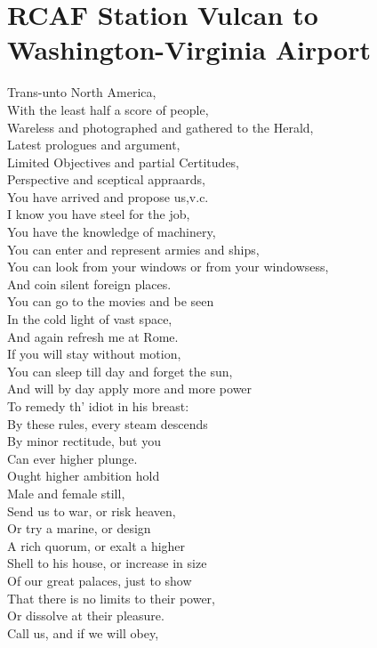 \documentclass[smalldemyvopaper,11pt,twoside,onecolumn,openright,extrafontsizes]{memoir}
\begin{document}
\chapter{RCAF Station Vulcan to Washington-Virginia Airport}
Trans-unto North America,
\\With the least half a score of people,
\\Wareless and photographed and gathered to the Herald,
\\Latest prologues and argument,
\\Limited Objectives and partial Certitudes,
\\Perspective and sceptical appraards,
\\You have arrived and propose us,v.c.
\\I know you have steel for the job,
\\You have the knowledge of machinery,
\\You can enter and represent armies and ships,
\\You can look from your windows or from your windowsess,
\\And coin silent foreign places.
\\You can go to the movies and be seen
\\In the cold light of vast space,
\\And again refresh me at Rome.
\\If you will stay without motion,
\\You can sleep till day and forget the sun,
\\And will by day apply more and more power
\\To remedy th' idiot in his breast:
\\By these rules, every steam descends
\\By minor rectitude, but you
\\Can ever higher plunge.
\\Ought higher ambition hold
\\Male and female still,
\\Send us to war, or risk heaven,
\\Or try a marine, or design
\\A rich quorum, or exalt a higher
\\Shell to his house, or increase in size
\\Of our great palaces, just to show
\\That there is no limits to their power,
\\Or dissolve at their pleasure.
\\Call us, and if we will obey,
\end{document}
